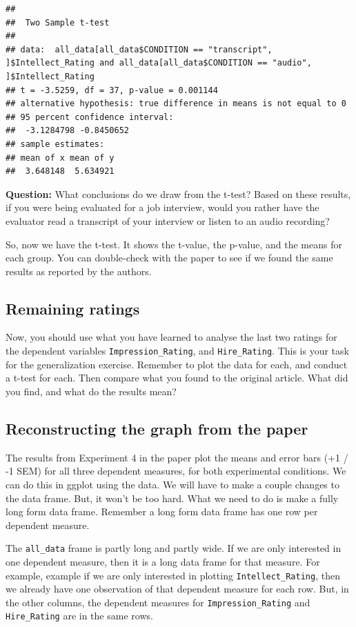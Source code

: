 \documentclass[]{book}
\begin{document}
\begin{verbatim}
## 
##  Two Sample t-test
## 
## data:  all_data[all_data$CONDITION == "transcript", ]$Intellect_Rating and all_data[all_data$CONDITION == "audio", ]$Intellect_Rating
## t = -3.5259, df = 37, p-value = 0.001144
## alternative hypothesis: true difference in means is not equal to 0
## 95 percent confidence interval:
##  -3.1284798 -0.8450652
## sample estimates:
## mean of x mean of y 
##  3.648148  5.634921
\end{verbatim}

\textbf{Question:} What conclusions do we draw from the t-test? Based on
these results, if you were being evaluated for a job interview, would
you rather have the evaluator read a transcript of your interview or
listen to an audio recording?

So, now we have the t-test. It shows the t-value, the p-value, and the
means for each group. You can double-check with the paper to see if we
found the same results as reported by the authors.

\subsection{Remaining ratings}\label{remaining-ratings}

Now, you should use what you have learned to analyse the last two
ratings for the dependent variables \texttt{Impression\_Rating}, and
\texttt{Hire\_Rating}. This is your task for the generalization
exercise. Remember to plot the data for each, and conduct a t-test for
each. Then compare what you found to the original article. What did you
find, and what do the results mean?

\subsection{Reconstructing the graph from the
paper}\label{reconstructing-the-graph-from-the-paper}

The results from Experiment 4 in the paper plot the means and error bars
(+1 / -1 SEM) for all three dependent measures, for both experimental
conditions. We can do this in ggplot using the data. We will have to
make a couple changes to the data frame. But, it won't be too hard. What
we need to do is make a fully long form data frame. Remember a long form
data frame has one row per dependent measure.

The \texttt{all\_data} frame is partly long and partly wide. If we are
only interested in one dependent measure, then it is a long data frame
for that measure. For example, example if we are only interested in
plotting \texttt{Intellect\_Rating}, then we already have one
observation of that dependent measure for each row. But, in the other
columns, the dependent measures for \texttt{Impression\_Rating} and
\texttt{Hire\_Rating} are in the same rows.
\end{document}
